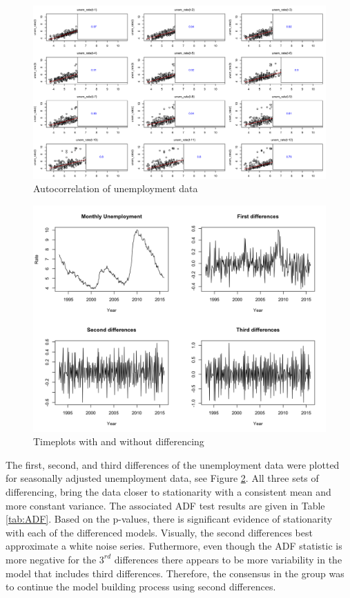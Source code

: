 \documentclass[twoside,twocolumn]{article}
\begin{document}
						\begin{figure}[H]
		\centering
		\caption{Autocorrelation of unemployment data}
		\label{fig:laggedunemployment}
		\includegraphics[width=\linewidth]{images/laggedunemployment}
	\end{figure}
			


					\begin{figure}[H]
		\centering
		\caption{Timeplots with and without differencing}
		\label{fig:seasonalunem}
		\includegraphics[width=\linewidth]{images/seasonalunem}
	\end{figure}

The first, second, and third differences of the unemployment data were plotted for seasonally adjusted unemployment data, see Figure \ref{fig:seasonalunem}. All three sets of differencing, bring the data closer to stationarity with a consistent mean and more constant variance. The associated ADF test results are given in Table \ref{tab:ADF}. Based on the p-values, there is significant evidence of stationarity with each of the differenced models. Visually, the second differences best approximate a white noise series. Futhermore, even though the ADF statistic is more negative for the \(3^{rd}\) differences there appears to be more variability in the model that includes third differences.  Therefore, the consensus in the group was to continue the model building process using second differences.
\end{document}
